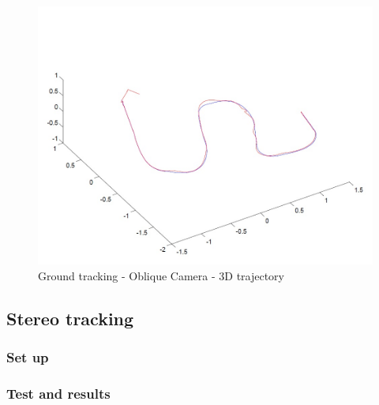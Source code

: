\begin{figure}[ht]
\centering
\includegraphics[width=0.7\linewidth]{../Images/c3/sim2_traj_both_3d}
\caption{Ground tracking - Oblique Camera - 3D trajectory}
\label{fig:sim2_traj_both_3d}
\end{figure}




\subsection{Stereo tracking}
\subsubsection{Set up}
\subsubsection{Test and results}